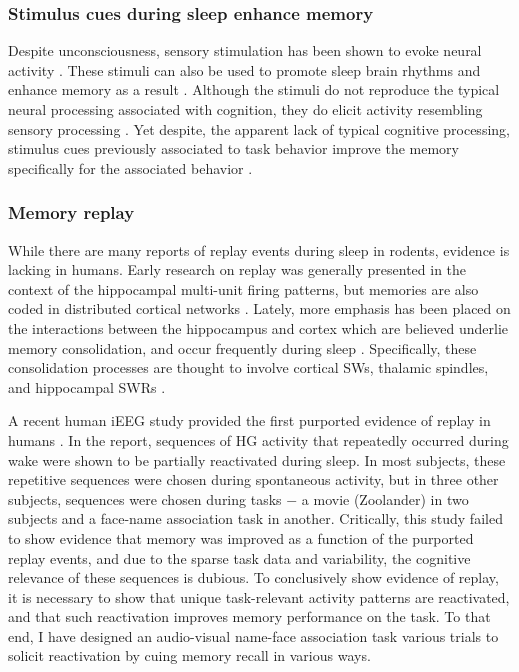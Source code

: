 \subsubsection*{Stimulus cues during sleep enhance memory}
Despite unconsciousness, sensory stimulation has been shown to evoke neural activity \citep{Sela2016b, Pereira2017, Sharon2017}. These stimuli can also be used to promote sleep brain rhythms and enhance memory as a result \citep{Ngo2013}. Although the stimuli do not reproduce the typical neural processing associated with cognition, they do elicit activity resembling sensory processing \citep{Makov2017e}. Yet despite, the apparent lack of typical cognitive processing, stimulus cues previously associated to task behavior improve the memory specifically for the associated behavior \citep{Rasch2007, Rudoy2009a, Antony2012,Creery2015}.

\subsubsection*{Memory replay}
While there are many reports of replay events during sleep in rodents, evidence is lacking in humans. Early research on replay was generally presented in the context of the hippocampal multi-unit firing patterns, but memories are also coded in distributed cortical networks \citep{Wilson1994, Hoffman2002, Yassa2013, Wilber2017}. Lately, more emphasis has been placed on the interactions between the hippocampus and cortex which are believed underlie memory consolidation, and occur frequently during sleep \citep{Rasch2013, Abel2013}. Specifically, these consolidation processes are thought to involve cortical SWs, thalamic spindles, and hippocampal SWRs \citep{Siapas1998, Molle2006, Maingret2016, Skelin2018}.

A recent human iEEG study provided the first purported evidence of replay in humans \citep{Jiang2017}. In the report, sequences of HG activity that repeatedly occurred during wake were shown to be partially reactivated during sleep. In most subjects, these repetitive sequences were chosen during spontaneous activity, but in three other subjects, sequences were chosen during tasks $-$ a movie (Zoolander) in two subjects and a face-name association task in another. Critically, this study failed to show evidence that memory was improved as a function of the purported replay events, and due to the sparse task data and variability, the cognitive relevance of these sequences is dubious. To conclusively show evidence of replay, it is necessary to show that unique task-relevant activity patterns are reactivated, and that such reactivation improves memory performance on the task. To that end, I have designed an audio-visual name-face association task various trials to solicit reactivation by cuing memory recall in various ways.  

